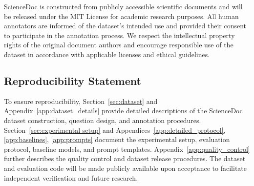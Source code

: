 \documentclass{article} %
\begin{document}
ScienceDoc is constructed from publicly accessible scientific documents and will be released under the MIT License for academic research purposes. All human annotators are informed of the dataset's intended use and provided their consent to participate in the annotation process. We respect the intellectual property rights of the original document authors and encourage responsible use of the dataset in accordance with applicable licenses and ethical guidelines.

\subsection*{Reproducibility Statement}

To ensure reproducibility, Section~\ref{sec:dataset} and Appendix~\ref{app:dataset_details} provide detailed descriptions of the ScienceDoc dataset construction, question design, and annotation procedures. Section~\ref{sec:experimental setup} and Appendices~\ref{app:detailed_protocol}, \ref{app:baselines}, \ref{app:prompts} document the experimental setup, evaluation protocol, baseline models, and prompt templates. Appendix~\ref{app:quality_control} further describes the quality control and dataset release procedures. The dataset and evaluation code will be made publicly available upon acceptance to facilitate independent verification and future research.





\appendix
\clearpage
\begingroup
\renewcommand{\encodingdefault}{OT1}
\normalfont
{}
\hypersetup{hidelinks}
\makeatletter
\def\@pnumwidth{2em}
\def\@tocrmarg{3em}
\def\@dotsep{5}
\newcommand{\AppendixContentsSection}[2]{%
    \par\addvspace{14pt}%
    \begingroup
    \def\@dotsep{10000}%
    \@dottedtocline{1}{0em}{1.5em}%
        {\hyperref[#1]{\color{appendixcontentsblue}\bfseries\numberline{\ref*{#1}}#2}}%
        {\hyperref[#1]{\color{black}\bfseries\pageref*{#1}}}%
    \endgroup
    \nopagebreak[4]%
}
\newcommand{\AppendixContentsSubsection}[2]{%
    \par\addvspace{6pt}%
    \@dottedtocline{2}{1.5em}{3em}%
        {\hyperref[#1]{\color{appendixcontentsblue}\numberline{\ref*{#1}}#2}}%
        {\hyperref[#1]{\color{black}\pageref*{#1}}}%
}
\makeatother
\end{document}
